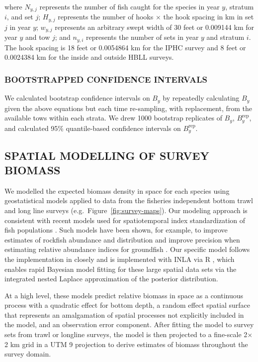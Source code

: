\documentclass[11pt]{book}\usepackage[]{graphicx}\usepackage[]{color}
\begin{document}
where $N_{y,j}$ represents the number of fish caught for the species in year
$y$, stratum $i$, and set $j$; $H_{y,j}$ represents the number of hooks $\times$
the hook spacing in km in set $j$ in year $y$; $w_{y,j}$ represents an arbitrary
swept width of 30 feet or 0.009144 km for year $y$ and tow $j$; and $n_{y,i}$
represents the number of sets in year $y$ and stratum $i$. The hook spacing is
18 feet or 0.0054864 km for the IPHC survey and 8 feet or 0.0024384 km for
the inside and outside HBLL surveys.

\subsubsection{BOOTSTRAPPED CONFIDENCE INTERVALS}

We calculated bootstrap confidence intervals on $B_y$ by repeatedly calculating
$B_y$ given the above equations but each time re-sampling, with replacement, from
the available tows within each strata. We drew 1000 bootstrap replicates of
$B_y$, $B_y^{\mathrm{rep}}$, and calculated 95\% quantile-based confidence
intervals on $B_y^{\mathrm{rep}}$.


\subsection{SPATIAL MODELLING OF SURVEY BIOMASS} \label{sec:spatial-modeling}


We modelled the expected biomass density in space for each species using
geostatistical models applied to data from the fisheries independent bottom
trawl and long line surveys (e.g.~Figure~\ref{fig:survey-maps}). Our modeling
approach is consistent with recent models used for spatiotemporal index
standardization of fish populations
\citep[e.g.][]{shelton2014,ward2015,thorson2015,thorson2016}. Such models have
been shown, for example, to improve estimates of rockfish abundance and
distribution \citep{shelton2014} and improve precision when estimating relative
abundance indices for groundfish \citep{thorson2015}. Our specific model follows
the implementation in \citet{shelton2018} closely and is implemented with INLA
\citep{rue2009, lindgren2015} via R \citep{rcoreteam2018}, which enables rapid
Bayesian model fitting for these large spatial data sets via the integrated
nested Laplace approximation of the posterior distribution.

At a high level, these models predict relative biomass in space as a continuous
process with a quadratic effect for bottom depth, a random effect spatial
surface that represents an amalgamation of spatial processes not explicitly
included in the model, and an observation error component. After fitting the
model to survey sets from trawl or longline surveys, the model is then projected
to a fine-scale 2$\times$2 km grid in a UTM 9 projection to derive estimates of
biomass throughout the survey domain.
\end{document}
